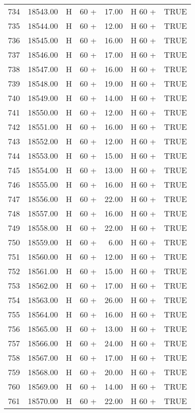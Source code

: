 \begin{table}[ht]
\begin{tabular}{rrllrll}
  734 & 18543.00 & H & 60 + & 17.00 & H 60 + & TRUE \\ 
  735 & 18544.00 & H & 60 + & 12.00 & H 60 + & TRUE \\ 
  736 & 18545.00 & H & 60 + & 16.00 & H 60 + & TRUE \\ 
  737 & 18546.00 & H & 60 + & 17.00 & H 60 + & TRUE \\ 
  738 & 18547.00 & H & 60 + & 16.00 & H 60 + & TRUE \\ 
  739 & 18548.00 & H & 60 + & 19.00 & H 60 + & TRUE \\ 
  740 & 18549.00 & H & 60 + & 14.00 & H 60 + & TRUE \\ 
  741 & 18550.00 & H & 60 + & 12.00 & H 60 + & TRUE \\ 
  742 & 18551.00 & H & 60 + & 16.00 & H 60 + & TRUE \\ 
  743 & 18552.00 & H & 60 + & 12.00 & H 60 + & TRUE \\ 
  744 & 18553.00 & H & 60 + & 15.00 & H 60 + & TRUE \\ 
  745 & 18554.00 & H & 60 + & 13.00 & H 60 + & TRUE \\ 
  746 & 18555.00 & H & 60 + & 16.00 & H 60 + & TRUE \\ 
  747 & 18556.00 & H & 60 + & 22.00 & H 60 + & TRUE \\ 
  748 & 18557.00 & H & 60 + & 16.00 & H 60 + & TRUE \\ 
  749 & 18558.00 & H & 60 + & 22.00 & H 60 + & TRUE \\ 
  750 & 18559.00 & H & 60 + & 6.00 & H 60 + & TRUE \\ 
  751 & 18560.00 & H & 60 + & 12.00 & H 60 + & TRUE \\ 
  752 & 18561.00 & H & 60 + & 15.00 & H 60 + & TRUE \\ 
  753 & 18562.00 & H & 60 + & 17.00 & H 60 + & TRUE \\ 
  754 & 18563.00 & H & 60 + & 26.00 & H 60 + & TRUE \\ 
  755 & 18564.00 & H & 60 + & 16.00 & H 60 + & TRUE \\ 
  756 & 18565.00 & H & 60 + & 13.00 & H 60 + & TRUE \\ 
  757 & 18566.00 & H & 60 + & 24.00 & H 60 + & TRUE \\ 
  758 & 18567.00 & H & 60 + & 17.00 & H 60 + & TRUE \\ 
  759 & 18568.00 & H & 60 + & 20.00 & H 60 + & TRUE \\ 
  760 & 18569.00 & H & 60 + & 14.00 & H 60 + & TRUE \\ 
  761 & 18570.00 & H & 60 + & 22.00 & H 60 + & TRUE \\ 

\end{tabular}
\end{table}

